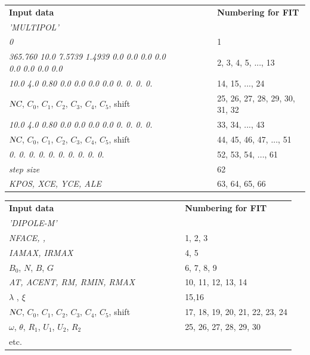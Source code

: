 \begin{center}
{\renewcommand{\arraystretch}{1}
	\begin{tabular}{lcl}
	\textbf{Input  data}  &~~~~~~~~&  \textbf{Numbering  for  FIT}\\
      \textsl{'MULTIPOL'}                      \\
	\textsl{0 }     &  &  1 \\
	\textsl{365.760 10.0 7.5739 1.4939 0.0 0.0 0.0 0.0 0.0 0.0 0.0 0.0} &&  2, 3, 4, 5, ..., 13    \\
	\textsl{10.0  4.0  0.80 0.0 0.0 0.0 0.0 0. 0. 0. 0. }     &&  14, 15, ..., 24       \\
	$\textsl{NC}$, $C_0$, $C_1$, $C_2$, $C_3$, $C_4$, $C_5$, shift &&  25, 26, 27, 28, 29, 30, 31, 32  \\
	\textsl{10.0  4.0  0.80 0.0 0.0 0.0 0.0 0. 0. 0. 0. }     &&  33, 34, ..., 43       \\
	$\textsl{NC}$, $C_0$, $C_1$, $C_2$, $C_3$, $C_4$, $C_5$, shift &&  44, 45, 46, 47, ...,    51    \\
	\textsl{0. 0. 0. 0. 0. 0. 0. 0. 0. 0.  }     &&  52, 53, 54, ..., 61   \\
	\textsl{ step size }     && 62    \\
	\textsl{ KPOS, XCE, YCE, ALE }     && 63, 64, 65, 66    \\
	\end{tabular}   }
\end{center}

\newpage

\begin{center}
{\renewcommand{\arraystretch}{1}
	\begin{tabular}{lcl}
	\textbf{Input  data}  &~~~~~~~~&  \textbf{Numbering  for  FIT}\\
      \textsl{'DIPOLE-M'}                      \\
	\textsl{NFACE,  \IC,  \IL}     &  &  1, 2, 3 \\
	\textsl{IAMAX,  IRMAX}         &&  4, 5    \\
	$B_0$, $N$, $B$, $G$  &&  6, 7, 8, 9\\
	\textsl{AT, ACENT, RM, RMIN, RMAX} &&  10, 11, 12, 13, 14 \\
	$\lambda$ , $\xi$     &&  15,16    \\
	$\textsl{NC}$, $C_0$, $C_1$, $C_2$, $C_3$, $C_4$, $C_5$, shift
	                      &&  17, 18, 19, 20, 21, 22, 23, 24\\
	$\omega$, $\theta$, $R_1$, $U_1$, $U_2$, $R_2$ 
	                      && 25, 26, 27, 28, 29, 30 \\
	etc.                 && 
	\end{tabular}   }
\end{center}




